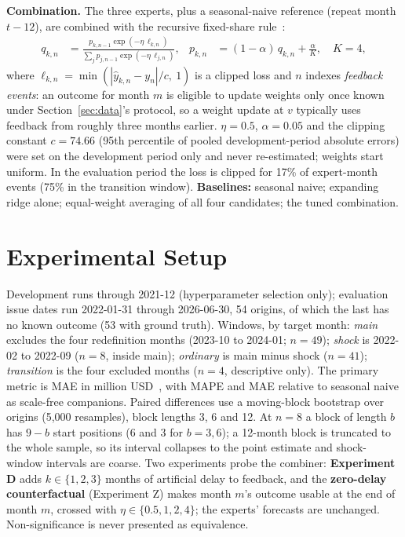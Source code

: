 \documentclass[runningheads]{llncs}
\begin{document}
\textbf{Combination.} The three experts, plus a seasonal-naive reference (repeat month $t-12$),
are combined with the recursive fixed-share rule~\cite{herbster1998tracking}:
\begin{align}
q_{k,n} &= \frac{p_{k,n-1}\exp(-\eta\,\ell_{k,n})}{\sum_j p_{j,n-1}\exp(-\eta\,\ell_{j,n})}, &
p_{k,n} &= (1-\alpha)\,q_{k,n} + \frac{\alpha}{K}, \quad K=4,
\end{align}
where $\ell_{k,n} = \min(|\hat y_{k,n} - y_n| / c,\ 1)$ is a clipped loss and $n$ indexes
\emph{feedback events}: an outcome for month $m$ is eligible to update weights only once known
under Section~\ref{sec:data}'s protocol, so a weight update at $v$ typically uses feedback from
roughly three months earlier. $\eta=0.5$, $\alpha=0.05$ and the clipping constant $c=74.66$ (95th
percentile of pooled development-period absolute errors) were set on the development period only
and never re-estimated; weights start uniform. In the evaluation period the loss is clipped for
17\% of expert-month events (75\% in the transition window). \textbf{Baselines:} seasonal naive;
expanding ridge alone; equal-weight averaging of all four candidates; the tuned combination.

\section{Experimental Setup}
\label{sec:setup}

Development runs through 2021-12 (hyperparameter selection only); evaluation issue dates run
2022-01-31 through 2026-06-30, 54 origins, of which the last has no known outcome (53 with ground
truth). Windows, by target month: \emph{main} excludes the four redefinition months (2023-10 to
2024-01; $n=49$); \emph{shock} is 2022-02 to 2022-09 ($n=8$, inside main); \emph{ordinary} is main
minus shock ($n=41$); \emph{transition} is the four excluded months ($n=4$, descriptive only). The
primary metric is MAE in million USD~\cite{hyndman2006another}, with MAPE and MAE relative to seasonal
naive as scale-free companions. Paired differences use a moving-block bootstrap over origins (5{,}000
resamples), block lengths 3, 6 and 12. At $n=8$ a block of length $b$ has $9-b$ start positions (6
and 3 for $b=3,6$); a 12-month block is truncated to the whole sample, so its interval collapses to
the point estimate and shock-window intervals are coarse. Two experiments probe the combiner: \textbf{Experiment D} adds $k \in \{1,2,3\}$ months
of artificial delay to feedback, and the \textbf{zero-delay counterfactual} (Experiment Z) makes
month $m$'s outcome usable at the end of month $m$, crossed with $\eta \in \{0.5,1,2,4\}$; the
experts' forecasts are unchanged. Non-significance is never presented as equivalence.
\end{document}
